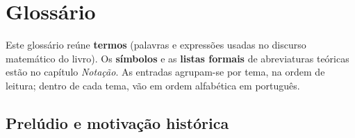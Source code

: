 
\clearpage
{}
\chapter*{Glossário}

\noindent
Este glossário reúne \textbf{termos} (palavras e expressões usadas no discurso matemático do livro). Os \textbf{símbolos} e as \textbf{listas formais} de abreviaturas teóricas estão no capítulo \emph{Notação}. As entradas agrupam-se por tema, na ordem de leitura; dentro de cada tema, vão em ordem alfabética em português.

\section*{Prelúdio e motivação histórica}

